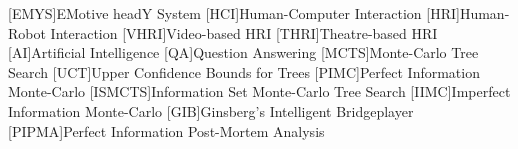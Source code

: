 \renewcommand{\listofacronymsname}{Glossary}
\listofacronyms

\begin{acronym}[PIPMA]
[EMYS]{EMotive headY System}
[HCI]{Human-Computer Interaction}
[HRI]{Human-Robot Interaction}
[VHRI]{Video-based HRI}
[THRI]{Theatre-based HRI}
[AI]{Artificial Intelligence}
[QA]{Question Answering}
[MCTS]{Monte-Carlo Tree Search}
[UCT]{Upper Confidence Bounds for Trees}
[PIMC]{Perfect Information Monte-Carlo}
[ISMCTS]{Information Set Monte-Carlo Tree Search}
[IIMC]{Imperfect Information Monte-Carlo}
[GIB]{Ginsberg's Intelligent Bridgeplayer}
[PIPMA]{Perfect Information Post-Mortem Analysis}
\end{acronym}

\cleardoublepage

